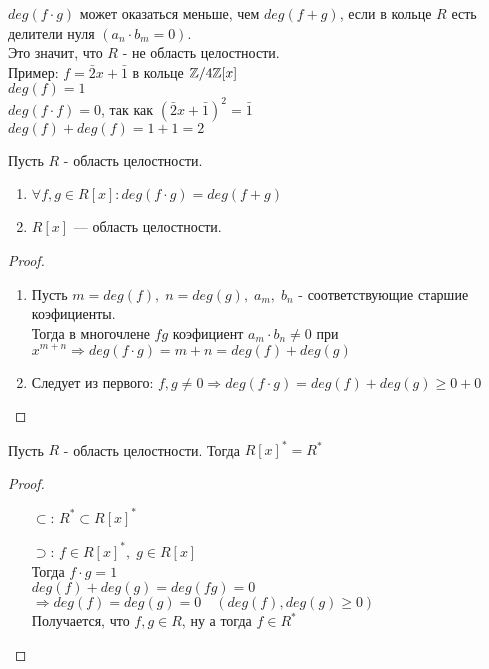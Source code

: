 \begin{normalsize}
\notice
$deg(f\cdot g)$ может оказаться меньше, чем $deg(f + g)$, если в кольце $R$ есть делители нуля $(a_n\cdot b_m = 0)$. \\
Это значит, что $R$ - не область целостности. \\
Пример: $f = \bar{2}x + \bar{1}$ в кольце $\mathbb{Z} / 4\mathbb{Z}[x]$ \\
$deg(f) = 1$ \\
$deg(f\cdot f) = 0$, так как $(\bar{2}x + \bar{1})^2=\bar{1}$ \\
$deg(f) + deg(f)= 1 + 1 = 2$ \\

\begin{theorem-non}
    Пусть $R$ - область целостности.
    \begin{enumerate}
        \item $\forall f,g \in R[x]: deg(f\cdot g) = deg(f + g)$
        \item $R[x]$ --- область целостности.
    \end{enumerate}
\end{theorem-non}

\begin{proof}
    $ $
    \begin{enumerate}
        \item Пусть $m = deg(f),\; n = deg(g),\; a_m,\; b_n$ - соответствующие старшие коэфициенты. \\
        Тогда в многочлене $fg$ коэфициент $a_m\cdot b_n \neq 0$ при $x^{m+n} \Rightarrow deg(f\cdot g) = m + n = deg(f) + deg(g)$    
        \item Следует из первого: $f,g \neq 0 \Rightarrow deg(f\cdot g) = deg(f) + deg(g) \geqslant 0 + 0$
    \end{enumerate}
\end{proof}
\follow \; Пусть $R$ - область целостности. Тогда $R[x]^* = R^*$
\begin{proof}
    $ $
    \begin{itemize}
        \item[$\subset$:] $R^* \subset R[x]^*$
        \item[$\supset$:] $f \in R[x]^*,\; g \in R[x]$ \\
        Тогда $f\cdot g = 1$ \\
        $deg(f) + deg(g) = deg(fg) = 0$ $\Rightarrow deg(f) = deg(g) = 0 \quad (deg(f), deg(g) \geqslant 0)$ \\
        Получается, что $f,g \in R$, ну а тогда $f \in R^*$ \\


\end{itemize}
\end{proof}
\end{normalsize}
